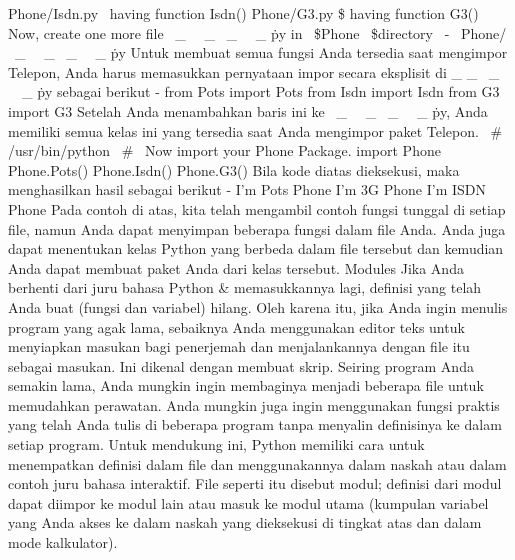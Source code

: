 Phone/Isdn.py \  \file having function Isdn()  
Phone/G3.py \$  \file having function G3() 
Now, create one more file  \  \_  \ \  \_  \init \  \_  \ \  \_  \.py in \  \$Phone \  \$directory  \ - \ 
Phone/ \  \_  \ \  \_  \init \  \_  \ \  \_  \.py  
Untuk membuat semua fungsi Anda tersedia saat mengimpor Telepon, Anda harus memasukkan pernyataan impor secara eksplisit di    \_     \_  \init \  \_  \ \  \_  \.py sebagai berikut - 
 \hspace*{0.5in} from Pots import Pots 
 \hspace*{0.5in} from Isdn import Isdn  
 \hspace*{0.5in} from G3 import G3 
Setelah Anda menambahkan baris ini ke  \  \_  \ \  \_  \init \  \_  \ \  \_  \.py, Anda memiliki semua kelas ini yang tersedia saat Anda mengimpor paket Telepon. 
 \hspace*{0.5in}  \  \#  \!/usr/bin/python 
 \hspace*{0.5in}  \  \#  \ Now import your Phone Package. 
 \hspace*{0.5in} import Phone 
 \hspace*{0.5in} Phone.Pots()  
 \hspace*{0.5in} Phone.Isdn() 
 \hspace*{0.5in} Phone.G3() 
Bila kode diatas dieksekusi, maka menghasilkan hasil sebagai berikut -  
 \hspace*{0.5in} I'm Pots Phone  
 \hspace*{0.5in} I'm 3G Phone  
 \hspace*{0.5in} I'm ISDN Phone  
Pada contoh di atas, kita telah mengambil contoh fungsi tunggal di setiap file, namun Anda dapat menyimpan beberapa fungsi dalam file Anda. Anda juga dapat menentukan kelas Python yang berbeda dalam file tersebut dan kemudian Anda dapat membuat paket Anda dari kelas tersebut.
Modules  
Jika Anda berhenti dari juru bahasa Python & memasukkannya lagi, definisi yang telah Anda buat (fungsi dan variabel) hilang. Oleh karena itu, jika Anda ingin menulis program yang agak lama, sebaiknya Anda menggunakan editor teks untuk menyiapkan masukan bagi penerjemah dan menjalankannya dengan file itu sebagai masukan. Ini dikenal dengan membuat skrip. Seiring program Anda semakin lama, Anda mungkin ingin membaginya menjadi beberapa file untuk memudahkan perawatan. Anda mungkin juga ingin menggunakan fungsi praktis yang telah Anda tulis di beberapa program tanpa menyalin definisinya ke dalam setiap program.  
Untuk mendukung ini, Python memiliki cara untuk menempatkan definisi dalam file dan menggunakannya dalam naskah atau dalam contoh juru bahasa interaktif. File seperti itu disebut modul; definisi dari modul dapat diimpor ke modul lain atau masuk ke modul utama (kumpulan variabel yang Anda akses ke dalam naskah yang dieksekusi di tingkat atas dan dalam mode kalkulator).  
